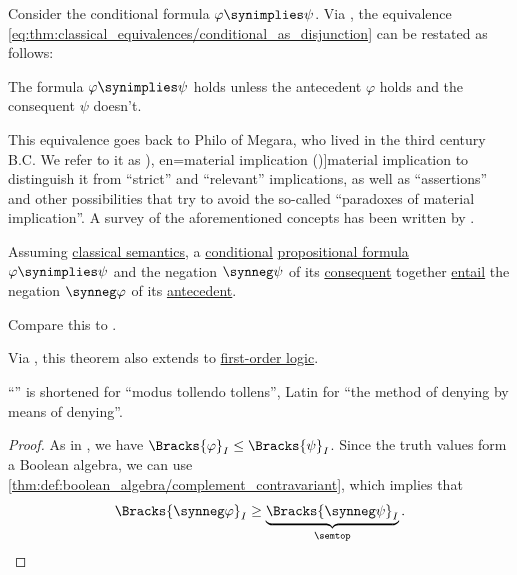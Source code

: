 \begin{concept}\label{con:material_implication}
  Consider the conditional formula \( \varphi \synimplies \psi \). Via , the equivalence \eqref{eq:thm:classical_equivalences/conditional_as_disjunction} can be restated as follows:
  \begin{displayquote}
    The formula \( \varphi \synimplies \psi \) holds unless the antecedent \( \varphi \) holds and the consequent \( \psi \) doesn't.
  \end{displayquote}

  This equivalence goes back to Philo of Megara, who lived in the third century B.C. We refer to it as \term[ru=материальная импликация (\cite[74]{КолмогоровДрагалин2006ЛогикаВведение}), en=material implication (\cite[9]{Kleene2002Logic})]{material implication} to distinguish it from \enquote{strict} and \enquote{relevant} implications, as well as \enquote{assertions} and other possibilities that try to avoid the so-called \enquote{paradoxes of material implication}. A survey of the aforementioned concepts has been written by \textcite{StanfordPlato:logic_of_conditionals}.
\end{concept}

\begin{theorem}\label{thm:propositional_semantic_mt}
  Assuming \hyperref[def:truth_value_algebra/classical]{classical semantics}, a \hyperref[def:conditional_formula]{conditional} \hyperref[def:propositional_formula]{propositional formula} \( \varphi \synimplies \psi \) and the negation \( \synneg \psi \) of its \hyperref[def:conditional_formula/consequent]{consequent} together \hyperref[def:propositional_semantics/entailment]{entail} the negation \( \synneg \varphi \) of its \hyperref[def:conditional_formula/antecedent]{antecedent}.
\end{theorem}
\begin{comments}
  \item Compare this to .

  \item Via , this theorem also extends to \hyperref[def:first_order_logic]{first-order logic}.

  \item \enquote{} is shortened for \enquote{modus tollendo tollens}, Latin for \enquote{the method of denying by means of denying}.
\end{comments}
\begin{proof}
  As in , we have \( \Bracks{\varphi}_I \leq \Bracks{\psi}_I \). Since the truth values form a Boolean algebra, we can use \cref{thm:def:boolean_algebra/complement_contravariant}, which implies that
  \begin{equation*}
    \Bracks{\synneg \varphi}_I \geq \underbrace{\Bracks{\synneg \psi}_I}_{\semtop}.
  \end{equation*}
\end{proof}

